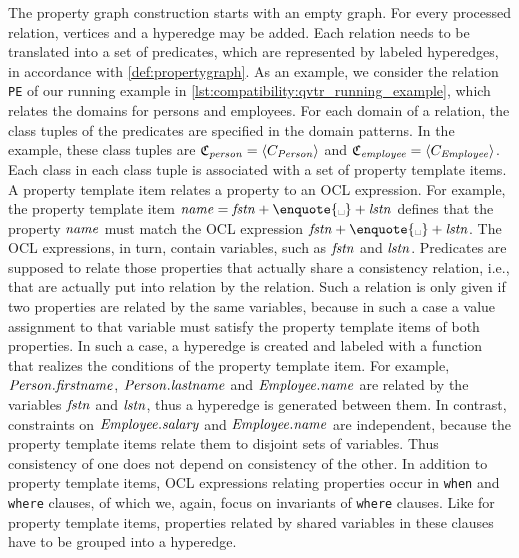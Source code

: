 The property graph construction starts with an empty graph.
For every processed \qvtr relation, vertices and a hyperedge may be added.
Each \qvtr relation needs to be translated into a set of predicates, which are represented by labeled hyperedges, in accordance with \autoref{def:propertygraph}.
As an example, we consider the relation \texttt{PE} of our running example in \autoref{lst:compatibility:qvtr_running_example}, which relates the domains for persons and employees.
For each domain of a relation, the class tuples of the predicates are specified in the domain patterns.
In the example, these class tuples are $\classtuple{C}{\mathvariable{person}} = \tupled{\class{C}{\mathvariable{Person}}}$ and $\classtuple{C}{\mathvariable{employee}} = \tupled{\class{C}{\mathvariable{Employee}}}$.
Each class in each class tuple is associated with a set of property template items.
A property template item relates a property to an \gls{OCL} expression. 
For example, the property template item $\mathvariable{name} = \mathvariable{fstn} + \text{\enquote{\textvisiblespace}} + \mathvariable{lstn}$ defines that the property $\mathit{name}$ must match the \gls{OCL} expression $\mathvariable{fstn} + \text{\enquote{\textvisiblespace}} + \mathvariable{lstn}$.
The \gls{OCL} expressions, in turn, contain \qvtr variables, such as $\mathit{fstn}$ and $\mathit{lstn}$.
Predicates are supposed to relate those properties that actually share a consistency relation, i.e., that are actually put into relation by the \qvtr relation.
Such a relation is only given if two properties are related by the same \qvtr variables, because in such a case a value assignment to that variable must satisfy the property template items of both properties.
In such a case, a hyperedge is created and labeled with a function that realizes the conditions of the property template item.
For example, $\mathit{Person.firstname}$, $\mathit{Person.lastname}$ and $\mathit{Employee.name}$ are related by the \qvtr variables $\mathit{fstn}$ and $\mathit{lstn}$, thus a hyperedge is generated between them.
In contrast, constraints on $\mathit{Employee.salary}$ and $\mathit{Employee.name}$ are independent, because the property template items relate them to disjoint sets of \qvtr variables. %
Thus consistency of one does not depend on consistency of the other.
In addition to property template items, \gls{OCL} expressions relating properties occur in \texttt{when} and \texttt{where} clauses, of which we, again, focus on invariants of \texttt{where} clauses.
Like for property template items, properties related by shared \qvtr variables in these clauses have to be grouped into a hyperedge.

